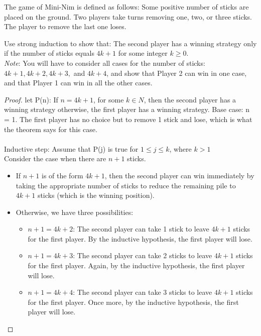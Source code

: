 \documentclass[a4paper]{exam}
\begin{document}
\begin{questions}
\question The game of Mini-Nim is defined as follows: Some positive number of sticks are placed on the ground. Two players take turns removing one, two, or three sticks. The player to remove the last one loses.

  Use strong induction to show that: The second player has a winning strategy only if the number of sticks equals \( 4k + 1 \) for some integer \( k \ge 0 \).\\
  \textit{Note}: You will have to consider all cases for the number of sticks: \( 4k+1, 4k+2, 4k+3, \) and \( 4k+4 \), and show that Player 2 can win in one case, and that Player 1 can win in all the other cases.

  \begin{solution}
    \begin{proof}
      let P(n): If $n = 4k + 1$, for some $k \in N$, then the second player has a winning strategy otherwise, the first player has a winning strategy.
      Base case: n = 1. The first player has no choice but to remove 1 stick and lose, which is
what the theorem says for this case.\\\\
      Inductive step: Assume that P(j) is true for $1 \leq j \leq k$, where $k > 1$\\
      Consider the case when there are $n + 1$ sticks.
\begin{itemize}
    \item If $n + 1$ is of the form $4k + 1$, then the second player can win immediately by taking the appropriate number of sticks to reduce the remaining pile to $4k + 1$ sticks (which is the winning position).
    \item Otherwise, we have three possibilities:
    \begin{itemize}
        \item $n + 1 = 4k + 2$: The second player can take 1 stick to leave $4k + 1$ sticks for the first player. By the inductive hypothesis, the first player will lose.
        \item $n + 1 = 4k + 3$: The second player can take 2 sticks to leave $4k + 1$ sticks for the first player. Again, by the inductive hypothesis, the first player will lose.
        \item $n + 1 = 4k + 4$: The second player can take 3 sticks to leave $4k + 1$ sticks for the first player. Once more, by the inductive hypothesis, the first player will lose.
    \end{itemize}
\end{itemize}


\end{proof}
\end{solution}
\end{questions}
\end{document}

